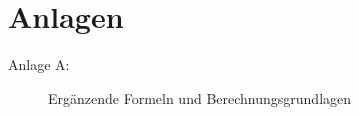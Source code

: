 \cleardoublepage
\appendix
{}
\chapter*{Anlagen}

\begin{description}
\item[Anlage A:] Ergänzende Formeln und Berechnungsgrundlagen\hfill \\

\end{description}
